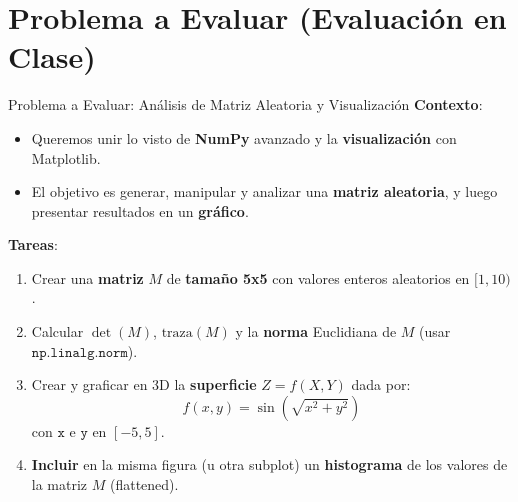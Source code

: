 \documentclass[10pt]{beamer}
\begin{document}
\section{Problema a Evaluar (Evaluación en Clase)}

\begin{frame}{Problema a Evaluar: Análisis de Matriz Aleatoria y Visualización}
  \textbf{Contexto}:
  \begin{itemize}
    \item Queremos unir lo visto de \textbf{NumPy} avanzado y la \textbf{visualización} con Matplotlib.
    \item El objetivo es generar, manipular y analizar una \textbf{matriz aleatoria}, y luego presentar resultados en un \textbf{gráfico}.
  \end{itemize}
  
  \textbf{Tareas}:
  \begin{enumerate}
    \item Crear una \textbf{matriz} \(M\) de \textbf{tamaño 5x5} con valores enteros aleatorios en \([1, 10)\).
    \item Calcular \(\det(M)\), \(\text{traza}(M)\) y la \textbf{norma} Euclidiana de \(M\) (usar \(\texttt{np.linalg.norm}\)).
    \item Crear y graficar en 3D la \textbf{superficie} \(Z = f(X,Y)\) dada por:
    \[
      f(x,y) = \sin\left(\sqrt{x^2 + y^2}\right)
    \]
    con \(\texttt{x}\) e \(\texttt{y}\) en \([-5,5]\).
    \item \textbf{Incluir} en la misma figura (u otra subplot) un \textbf{histograma} de los valores de la matriz \(M\) (flattened).
  \end{enumerate}
\end{frame}
\end{document}
